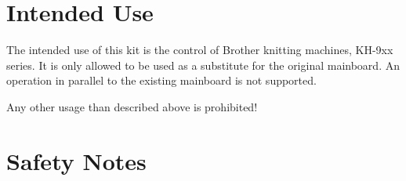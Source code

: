 \documentclass[fleqn,10pt]{SelfArx} %
\begin{document}

\section{Intended Use}

The intended use of this kit is the control of Brother knitting machines, KH-9xx series.
It is only allowed to be used as a substitute for the original mainboard. An operation in parallel to the existing mainboard is not supported.

Any other usage than described above is prohibited!


\section{Safety Notes}
\end{document}

